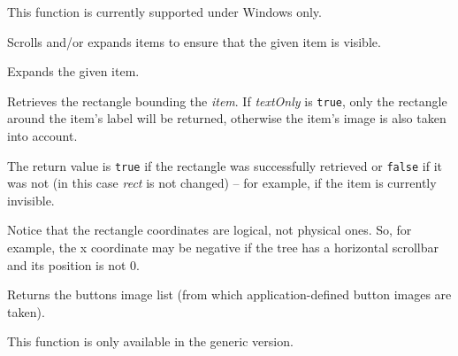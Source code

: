 This function is currently supported under Windows only.




\label{wxtreectrlensurevisible}


Scrolls and/or expands items to ensure that the given item is visible.


\label{wxtreectrlexpand}


Expands the given item.


\label{wxtreectrlgetitemrect}


Retrieves the rectangle bounding the {\it item}. If {\it textOnly} is {\tt true},
only the rectangle around the item's label will be returned, otherwise the
item's image is also taken into account.

The return value is {\tt true} if the rectangle was successfully retrieved or {\tt false}
if it was not (in this case {\it rect} is not changed) -- for example, if the
item is currently invisible.

Notice that the rectangle coordinates are logical, not physical ones. So, for
example, the x coordinate may be negative if the tree has a horizontal
scrollbar and its position is not $0$.




\label{wxtreectrlgetbuttonsimagelist}


Returns the buttons image list (from which application-defined button images are taken).

This function is only available in the generic version.


